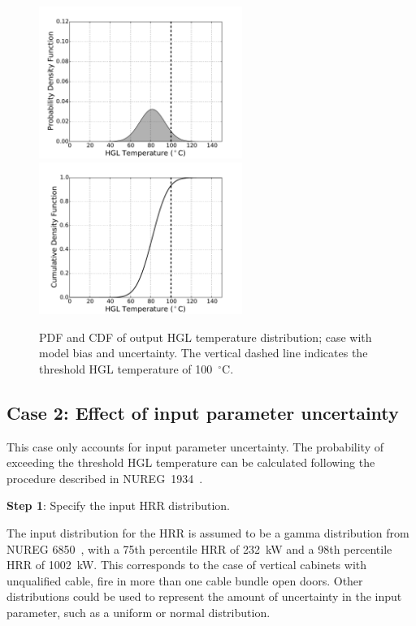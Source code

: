 \documentclass[12pt]{article}
\begin{document}
\begin{figure}[p]
\includegraphics[width=2.6in]{Figures/output_PDF_1_model}
\includegraphics[width=2.6in]{Figures/output_CDF_1_model}
\caption{PDF and CDF of output HGL temperature distribution; case with model bias and uncertainty. The vertical dashed line indicates the threshold HGL temperature of 100~$^\circ$C.}
\label{fig:case_1_output_distributions}
\end{figure}


\clearpage


\subsection{Case 2: Effect of input parameter uncertainty}

This case only accounts for input parameter uncertainty. The probability of exceeding the threshold HGL temperature can be calculated following the procedure described in NUREG~1934~\cite{NUREG_1934}.

\textbf{Step 1}: Specify the input HRR distribution.

The input distribution for the HRR is assumed to be a gamma distribution from NUREG 6850~\cite{NUREG_6850}, with a 75th percentile HRR of 232~kW and a 98th percentile HRR of 1002~kW. This corresponds to the case of vertical cabinets with unqualified cable, fire in more than one cable bundle open doors. Other distributions could be used to represent the amount of uncertainty in the input parameter, such as a uniform or normal distribution.
\end{document}
